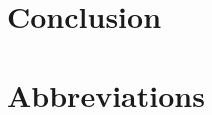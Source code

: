 \documentclass{bmcart}
\begin{document}
\section{Conclusion}\label{sec:conclusion}


\section{Abbreviations}\label{sec:abbreviations}

\acuseall

\printacronyms[include-classes=abbrev, name=Abbreviations, heading=none]

% 


\end{document}
